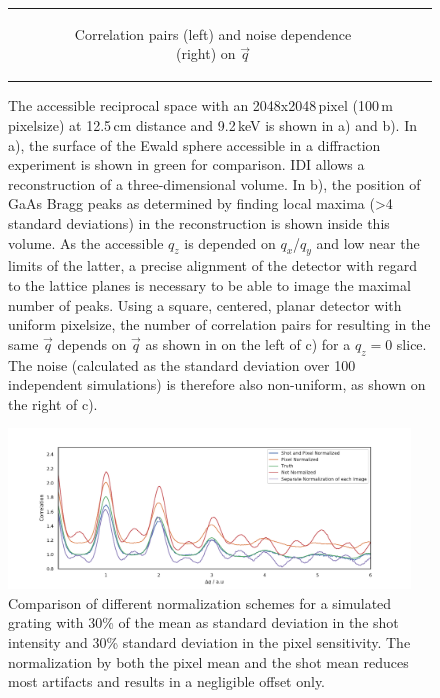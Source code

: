 \begin{figure}
\begin{tabular}[t]{cc}
\begin{subfigure}{0.52\textwidth}
			\caption{Correlation pairs (left) and noise dependence (right) on $\vec{q}$ } 
			\label{fig:pairnoise}
		\end{subfigure}\\
	\end{tabular}
	\caption[Accessible reciprocal space]{The accessible reciprocal space with an 2048x2048\,pixel (100\,\textmu m pixelsize) at 12.5\,cm distance and 9.2\,keV is shown in a) and b). In a), the surface of the Ewald sphere accessible in a diffraction experiment is shown in green for comparison. IDI allows a reconstruction of a three-dimensional volume. In b), the position of GaAs Bragg peaks as determined by finding local maxima (>4 standard deviations) in the reconstruction is shown inside this volume. As the accessible $q_z$ is depended on $q_x$/$q_y$ and low near the limits of the latter, a precise alignment of the detector with regard to the lattice planes is necessary to be able to image the maximal number of peaks. Using a square, centered, planar detector with uniform pixelsize, the number of correlation pairs for resulting in the same $\vec{q}$ depends on $\vec{q}$ as shown in on the left of c) for a $q_z=0$ slice. The noise (calculated as the standard deviation over 100 independent simulations) is therefore also non-uniform, as shown on the right of c).}
	
\end{figure}

\begin{figure}
	\centering
	\includegraphics[width=0.95\textwidth]{images/normalisation_comp.pdf}
	\caption[Comparison of Normalization Techniques]{Comparison of different normalization schemes for a simulated grating with 30\% of the mean as standard deviation in the shot intensity and 30\% standard deviation in the pixel sensitivity. The normalization by both the pixel mean and the shot mean reduces most artifacts and results in a negligible offset only.}
	\label{fig:norm_com}
\end{figure}

